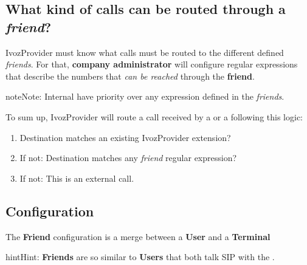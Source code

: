 \documentclass[letterpaper,10pt,english]{sphinxmanual}
\begin{document}
\subsection{What kind of calls can be routed through a \emph{friend}?}
\label{pbx_features/friends:what-kind-of-calls-can-be-routed-through-a-friend}
IvozProvider must know what calls must be routed to the different defined \emph{friends}.
For that, \textbf{company administrator} will configure regular expressions that
describe the numbers that \emph{can be reached} through the \textbf{friend}.

\begin{notice}{note}{Note:}
Internal {\hyperref[pbx_features/extensions:extensions]{}} have priority over any expression
defined in the \emph{friends}.
\end{notice}

To sum up, IvozProvider will route a call received by a {\hyperref[pbx_features/users:users]{}} or
a {\hyperref[pbx_features/friends:friends]{}} following this logic:
\begin{enumerate}
\item {} 
Destination matches an existing IvozProvider extension?

\item {} 
If not: Destination matches any \emph{friend} regular expression?

\item {} 
If not: This is an external call.

\end{enumerate}


\subsection{Configuration}
\label{pbx_features/friends:configuration}
The \textbf{Friend} configuration is a merge between a \textbf{User} and a \textbf{Terminal}

\begin{notice}{hint}{Hint:}
\textbf{Friends} are so similar to \textbf{Users} that both talk SIP with the
{\hyperref[internal_calls/god_portal:proxyusers]{}}.
\end{notice}
\end{document}
